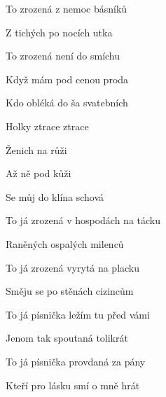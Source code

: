 

\zs
To  zrozená z nemoc básníků 

Z tichých po nocích utka 

To  zrozená není  do smíchu 

Když mám  pod cenou proda 
\ks

\zr
Kdo  obléká do ša svatebních 

Holky  ztrace ztrace  

Ženich  na růži 

Až ně  pod kůži 

Se můj  do klína schová 
\kr

\zs
To já zrozená v hospodách na tácku 

Raněných ospalých milenců 

To já zrozená vyrytá na placku 

Směju se po stěnách cizincům 
\ks

\zr	\kr

\zs
To já písnička ležím tu před vámi 

Jenom tak spoutaná tolikrát 

To já písnička provdaná za pány 

Kteří pro lásku smí o mně hrát 
\ks

\zr	\kr
\kp







